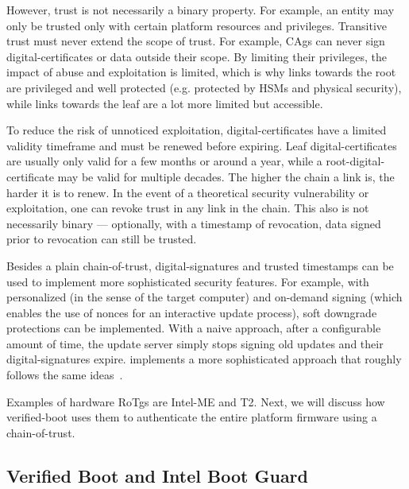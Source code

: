 However, trust is not necessarily a binary property. For example, an entity may only be trusted only with certain platform resources and privileges. Transitive trust must never extend the scope of trust. For example, \glspl{CAg} can never sign \glspl{digital-certificate} or data outside their scope. By limiting their privileges, the impact of abuse and exploitation is limited, which is why links towards the root are privileged and well protected (e.g. protected by \glspl{HSM} and physical security), while links towards the leaf are a lot more limited but accessible.

To reduce the risk of unnoticed exploitation, \glspl{digital-certificate} have a limited validity timeframe and must be renewed before expiring. Leaf \glspl{digital-certificate} are usually only valid for a few months or around a year, while a \gls{root-digital-certificate} may be valid for multiple decades. The higher the chain a link is, the harder it is to renew. In the event of a theoretical security vulnerability or exploitation, one can revoke trust in any link in the chain. This also is not necessarily binary --- optionally, with a timestamp of revocation, data signed prior to revocation can still be trusted.

Besides a plain \gls{chain-of-trust}, \glspl{digital-signature} and trusted timestamps can be used to implement more sophisticated security features. For example, with personalized (in the sense of the target computer) and on-demand signing (which enables the use of nonces for an interactive update process), soft downgrade protections can be implemented. With a naive approach, after a configurable amount of time, the update server simply stops signing old updates and their \glspl{digital-signature} expire.  implements a more sophisticated approach that roughly follows the same ideas~\cite{apple-sec}.

Examples of hardware \glspl{RoTg} are \gls{Intel-ME} and  T2. Next, we will discuss how \gls{verified-boot} uses them to authenticate the entire platform \gls{firmware} using a \gls{chain-of-trust}.

\subsection{Verified Boot and Intel Boot Guard}


